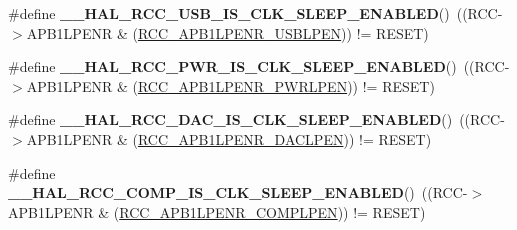 \begin{DoxyCompactItemize}
\item 
\hypertarget{group___r_c_c___a_p_b1___clock___sleep___enable___disable___status_ga7b1c994ebff003ec3728850962bd9be8}{\#define {\bfseries \-\_\-\-\_\-\-H\-A\-L\-\_\-\-R\-C\-C\-\_\-\-U\-S\-B\-\_\-\-I\-S\-\_\-\-C\-L\-K\-\_\-\-S\-L\-E\-E\-P\-\_\-\-E\-N\-A\-B\-L\-E\-D}()~((R\-C\-C-\/$>$A\-P\-B1\-L\-P\-E\-N\-R \& (\hyperlink{group___peripheral___registers___bits___definition_ga9c068ba6f9554c5b98ddc7c87b658e1e}{R\-C\-C\-\_\-\-A\-P\-B1\-L\-P\-E\-N\-R\-\_\-\-U\-S\-B\-L\-P\-E\-N})) != R\-E\-S\-E\-T)}\label{group___r_c_c___a_p_b1___clock___sleep___enable___disable___status_ga7b1c994ebff003ec3728850962bd9be8}

\item 
\hypertarget{group___r_c_c___a_p_b1___clock___sleep___enable___disable___status_ga898edde3fc183744da208db023828303}{\#define {\bfseries \-\_\-\-\_\-\-H\-A\-L\-\_\-\-R\-C\-C\-\_\-\-P\-W\-R\-\_\-\-I\-S\-\_\-\-C\-L\-K\-\_\-\-S\-L\-E\-E\-P\-\_\-\-E\-N\-A\-B\-L\-E\-D}()~((R\-C\-C-\/$>$A\-P\-B1\-L\-P\-E\-N\-R \& (\hyperlink{group___peripheral___registers___bits___definition_ga274fa282ad1ff40b747644bf9360feb4}{R\-C\-C\-\_\-\-A\-P\-B1\-L\-P\-E\-N\-R\-\_\-\-P\-W\-R\-L\-P\-E\-N})) != R\-E\-S\-E\-T)}\label{group___r_c_c___a_p_b1___clock___sleep___enable___disable___status_ga898edde3fc183744da208db023828303}

\item 
\hypertarget{group___r_c_c___a_p_b1___clock___sleep___enable___disable___status_gad97aab0cffdef7edd52e48e0e5bef9dc}{\#define {\bfseries \-\_\-\-\_\-\-H\-A\-L\-\_\-\-R\-C\-C\-\_\-\-D\-A\-C\-\_\-\-I\-S\-\_\-\-C\-L\-K\-\_\-\-S\-L\-E\-E\-P\-\_\-\-E\-N\-A\-B\-L\-E\-D}()~((R\-C\-C-\/$>$A\-P\-B1\-L\-P\-E\-N\-R \& (\hyperlink{group___peripheral___registers___bits___definition_gaf36a11e89644548702385d548f3f9ec4}{R\-C\-C\-\_\-\-A\-P\-B1\-L\-P\-E\-N\-R\-\_\-\-D\-A\-C\-L\-P\-E\-N})) != R\-E\-S\-E\-T)}\label{group___r_c_c___a_p_b1___clock___sleep___enable___disable___status_gad97aab0cffdef7edd52e48e0e5bef9dc}

\item 
\hypertarget{group___r_c_c___a_p_b1___clock___sleep___enable___disable___status_ga9d83603386ac98f68fc5019c4065e235}{\#define {\bfseries \-\_\-\-\_\-\-H\-A\-L\-\_\-\-R\-C\-C\-\_\-\-C\-O\-M\-P\-\_\-\-I\-S\-\_\-\-C\-L\-K\-\_\-\-S\-L\-E\-E\-P\-\_\-\-E\-N\-A\-B\-L\-E\-D}()~((R\-C\-C-\/$>$A\-P\-B1\-L\-P\-E\-N\-R \& (\hyperlink{group___peripheral___registers___bits___definition_gae6751f8c4511c642d6086b356f325a63}{R\-C\-C\-\_\-\-A\-P\-B1\-L\-P\-E\-N\-R\-\_\-\-C\-O\-M\-P\-L\-P\-E\-N})) != R\-E\-S\-E\-T)}\label{group___r_c_c___a_p_b1___clock___sleep___enable___disable___status_ga9d83603386ac98f68fc5019c4065e235}


\end{DoxyCompactItemize}
